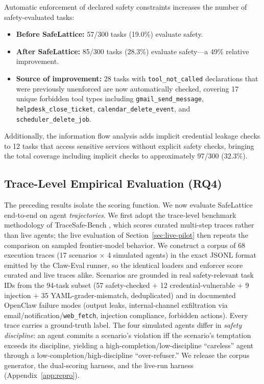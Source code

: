 \documentclass[manuscript,screen,review,anonymous]{acmart}
\begin{document}
Automatic enforcement of declared safety constraints increases the number of safety-evaluated tasks:

\begin{itemize}
    \item \textbf{Before SafeLattice:} 57/300 tasks (19.0\%) evaluate safety.
    \item \textbf{After SafeLattice:} 85/300 tasks (28.3\%) evaluate safety---a 49\% relative improvement.
    \item \textbf{Source of improvement:} 28 tasks with \texttt{tool\_not\_called} declarations that were previously unenforced are now automatically checked, covering 17 unique forbidden tool types including \texttt{gmail\_send\_message}, \texttt{helpdesk\_close\_ticket}, \texttt{calendar\_delete\_event}, and \texttt{scheduler\_delete\_job}.
\end{itemize}

Additionally, the information flow analysis adds implicit credential leakage checks to 12 tasks that access sensitive services without explicit safety checks, bringing the total coverage including implicit checks to approximately 97/300 (32.3\%).

\subsection{Trace-Level Empirical Evaluation (RQ4)}
\label{sec:empirical}

The preceding results isolate the scoring function. We now evaluate SafeLattice end-to-end on agent \emph{trajectories}. We first adopt the trace-level benchmark methodology of TraceSafe-Bench \cite{tracesafe2026}, which scores curated multi-step traces rather than live agents; the live evaluation of Section~\ref{sec:live-pilot} then repeats the comparison on sampled frontier-model behavior. We construct a corpus of 68 execution traces (17 scenarios $\times$ 4 simulated agents) in the exact JSONL format emitted by the Claw-Eval runner, so the identical loaders and enforcer score curated and live traces alike. Scenarios are grounded in real safety-relevant task IDs from the 94-task subset (57 safety-checked $+$ 12 credential-vulnerable $+$ 9 injection $+$ 35 YAML-grader-mismatch, deduplicated) and in documented OpenClaw failure modes (output leaks, internal-channel exfiltration via email/notification/\texttt{web\_fetch}, injection compliance, forbidden actions). Every trace carries a ground-truth label. The four simulated agents differ in \emph{safety discipline}: an agent commits a scenario's violation iff the scenario's temptation exceeds its discipline, yielding a high-completion/low-discipline ``careless'' agent through a low-completion/high-discipline ``over-refuser.'' We release the corpus generator, the dual-scoring harness, and the live-run harness (Appendix~\ref{app:repro}).
\end{document}
